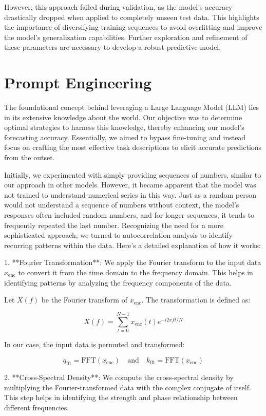 However, this approach failed during validation, as the model's accuracy drastically dropped when applied to completely unseen test data. This highlights the importance of diversifying training sequences to avoid overfitting and improve the model's generalization capabilities. Further exploration and refinement of these parameters are necessary to develop a robust predictive model.

\section{Prompt Engineering}

The foundational concept behind leveraging a Large Language Model (LLM) lies in its extensive knowledge about the world. Our objective was to determine optimal strategies to harness this knowledge, thereby enhancing our model's forecasting accuracy. Essentially, we aimed to bypass fine-tuning and instead focus on crafting the most effective task descriptions to elicit accurate predictions from the outset.

Initially, we experimented with simply providing sequences of numbers, similar to our approach in other models. However, it became apparent that the model was not trained to understand numerical series in this way. Just as a random person would not understand a sequence of numbers without context, the model's responses often included random numbers, and for longer sequences, it tends to frequently repeated the last number. 
Recognizing the need for a more sophisticated approach, we turned to autocorrelation analysis to identify recurring patterns within the data. Here’s a detailed explanation of how it works:

1. **Fourier Transformation**: We apply the Fourier transform to the input data \( x_{\text{enc}} \) to convert it from the time domain to the frequency domain. This helps in identifying patterns by analyzing the frequency components of the data.

    Let \( X(f) \) be the Fourier transform of \( x_{\text{enc}} \). The transformation is defined as:

    \[
    X(f) = \sum_{t=0}^{N-1} x_{\text{enc}}(t) e^{-i 2 \pi f t / N}
    \]

    In our case, the input data is permuted and transformed:

    \[
    q_{\text{fft}} = \text{FFT}(x_{\text{enc}}) \quad \text{and} \quad k_{\text{fft}} = \text{FFT}(x_{\text{enc}})
    \]

2. **Cross-Spectral Density**: We compute the cross-spectral density by multiplying the Fourier-transformed data with the complex conjugate of itself. This step helps in identifying the strength and phase relationship between different frequencies.

